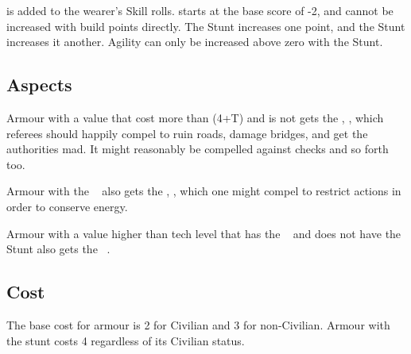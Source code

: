  is added to the wearer's  Skill rolls.  starts at the base score of -2, and cannot be increased with build points directly. The  Stunt increases  one point, and the  Stunt increases it another. Agility can only be increased above zero with the  Stunt.



\subsection[Personal Armour Aspects]{Aspects}
\label{sec:personal-armour-aspects}

Armour with a  value that cost more than (4+T) and is not  gets the \Aspect, , which referees should happily compel to ruin roads, damage bridges, and get the authorities mad. It might reasonably be compelled against  checks and so forth too.

Armour with the \Stunt\  also gets the \Aspect, , which one might compel to restrict actions in order to conserve energy.

Armour with a  value higher than tech level that has the \Stunt\  and does not have the Stunt  also gets the \Aspect\ .

\iflandscape{\vfil}{}

\subsection{Cost}
\label{sec:personal-armour-cost}

The base cost for armour is 2 for Civilian and 3 for non-Civilian.
Armour with the  stunt costs 4 regardless of its Civilian
status.

%

\vfil